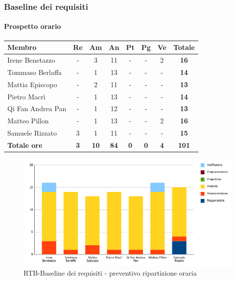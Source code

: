 \subsubsection{Baseline dei requisiti}
\paragraph{Prospetto orario}
\begin{center}
	\renewcommand{\arraystretch}{1.8} %
	\begin{tabular}{ |m{10em}|c|c|c|c|c|c|c| }
	\hline
	\textbf{Membro} & \textbf{Re} & \textbf{Am} &  \textbf{An} &  \textbf{Pt} &  \textbf{Pg} &  \textbf{Ve} &  \textbf{Totale}\\
    \hline
    Irene Benetazzo   & - & 3 & 11 & - & - & 2 & \textbf{16} \\
    \hline
    Tommaso Berlaffa  & - & 1 & 13 & - & - & - & \textbf{14} \\
    \hline
    Mattia Episcopo   & - & 2 & 11 & - & - & - & \textbf{13} \\
    \hline
    Pietro Macrì      & - & 1 & 13 & - & - & - & \textbf{14} \\
    \hline
    Qi Fan Andrea Pan & - & 1 & 12 & - & - & - & \textbf{13} \\
    \hline
    Matteo Pillon     & - & 1 & 13 & - & - & 2 & \textbf{16} \\
    \hline
    Samuele Rizzato   & 3 & 1 & 11 & - & - & - & \textbf{15} \\
    \hline
    \textbf{Totale ore} & \textbf{3} & \textbf{10} &  \textbf{84} &  \textbf{0} &  \textbf{0} &  \textbf{4} &  \textbf{101}\\
    \hline
	\end{tabular}
\end{center}
\begin{figure}[H]
    \centering\includegraphics[width=\textwidth, height=\textheight,keepaspectratio]{images/preventivo/RTB-requisiti-ore.png}
    \caption{RTB-Baseline dei requisiti - preventivo ripartizione oraria}
\end{figure}

